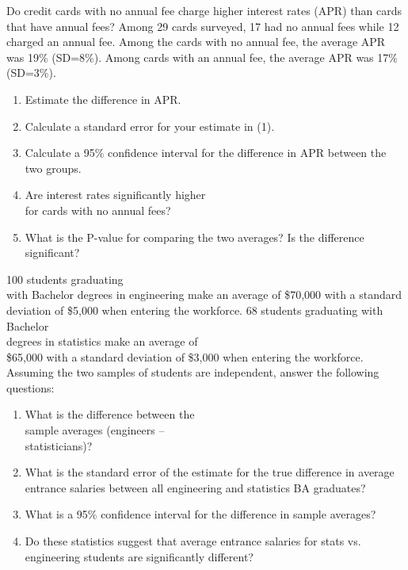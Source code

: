 \documentclass[11pt]{book}\usepackage[]{graphicx}\usepackage[]{color}
\begin{document}
\begin{exercises}
\begin{exercise} %

Do credit cards with no annual fee charge higher interest rates (APR) than cards that have annual fees?  Among 29 cards surveyed, 17 had no annual fees while 12 charged an annual fee.  Among the cards with no annual fee, the average APR was 19\% (SD=8\%).  Among cards with an annual fee, the average APR was 17\% (SD=3\%).

\begin{enumerate}
  \item Estimate the difference in APR.
  \item Calculate a standard error for your estimate in (1).
  \item Calculate a 95\% confidence interval for the difference in APR between the two groups.
  \item Are interest rates significantly higher \\ for cards with no annual fees?
  \item What is the P-value for comparing the two averages? Is the difference significant?
\end{enumerate}
\end{exercise}
\begin{solution} %


\end{solution}

\begin{exercise}  %

100 students graduating \\ with Bachelor degrees in engineering make an average of \$70,000 with a standard deviation of \$5,000 when entering the workforce. 68 students graduating with Bachelor \\ degrees in statistics make an average of \\ \$65,000 with a standard deviation of \$3,000 when entering the workforce. Assuming the two samples of students are independent, answer the following questions:

\begin{enumerate}
  \item What is the difference between the \\ sample averages (engineers – \\ statisticians)?
  \item What is the standard error of the estimate for the true difference in average entrance salaries between all engineering and statistics BA graduates?
  \item What is a 95\% confidence interval for the difference in sample averages?
  \item Do these statistics suggest that average entrance salaries for stats vs. engineering students are significantly different?
\end{enumerate}


\end{exercise}
\end{exercises}
\end{document}
